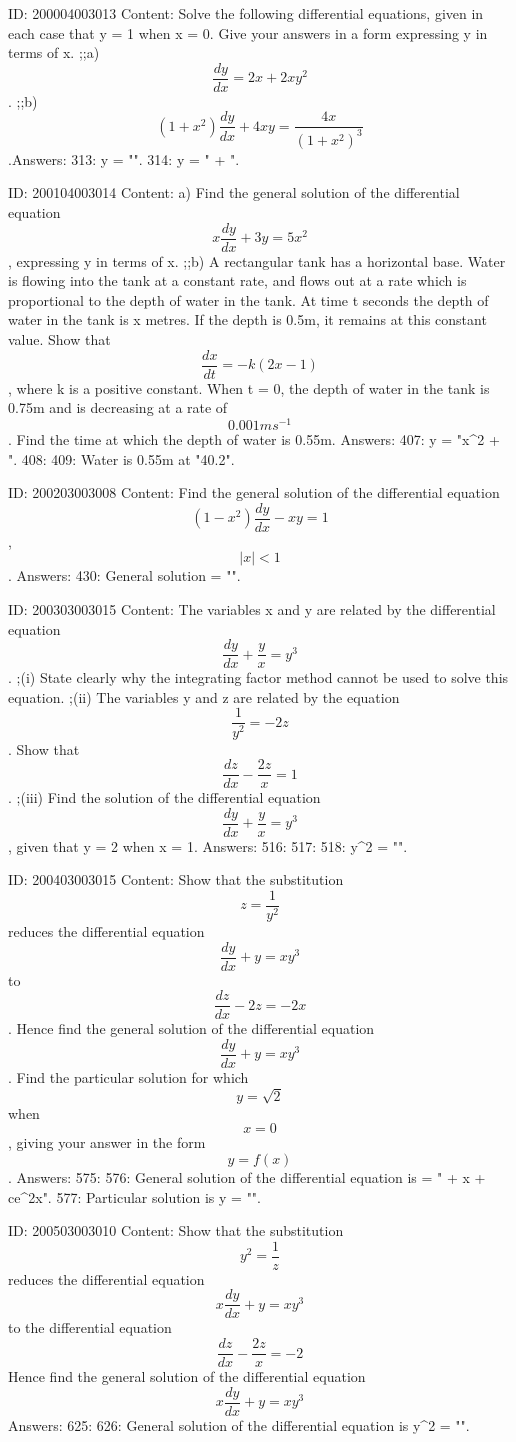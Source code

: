 \documentclass{article}
\begin{document}
ID: 200004003013
Content:
Solve the following differential equations, given in each case that y = 1 when x = 0. Give your answers in a form expressing y in terms of x. ;;a)$$\frac{dy}{dx} = 2x + 2xy^2 $$. ;;b)$$( 1 + x^2 )\frac{dy}{dx} + 4xy = \frac{4x}{( 1 + x^2  )^3}$$.Answers:
313: y = "".
314: y = " + ".

ID: 200104003014
Content:
a)  Find the general solution of the differential equation  $$x\frac{dy}{dx} + 3y = 5x^2 $$, expressing y in terms of x. ;;b) A rectangular tank has a horizontal base. Water is flowing into the tank at a constant rate, and flows out at a rate which is proportional to the depth of water in the tank. At time t seconds the depth of water in the tank   is x metres. If the depth is 0.5m, it remains at this constant value. Show that $$ \frac{dx}{dt} =  - k( 2x - 1 )$$, where k is a positive constant. When t = 0, the depth of water in the tank is 0.75m and is decreasing at a rate of  $$0.001ms^{- 1}$$. Find the time at which the depth of water is 0.55m.  Answers:
407: y = "x^2 + ".
408: 
409: Water is 0.55m at "40.2".

ID: 200203003008
Content:
Find the general solution of the differential equation  $$(1 - x^2)\frac{dy}{dx}- xy = 1$$,  $$| x | < 1$$. Answers:
430: General solution = "".

ID: 200303003015
Content:
The variables x and y are related by the differential equation  $$\frac{dy}{dx}+\frac{y}{x} = y^3 $$. ;(i) State clearly why the integrating factor method cannot be used to solve this equation. ;(ii) The variables y and z are related by the equation  $$\frac{1}{y^2} = -2z$$. Show that  $$\frac{dz}{dx} - \frac{2z}{x} = 1$$. ;(iii) Find the solution of the differential equation  $$\frac{dy}{dx} + \frac{y}{x} = y^3 $$, given that y = 2 when x = 1.  Answers:
516: 
517: 
518: y^2 = "".

ID: 200403003015
Content:
Show that the substitution  $$z = \frac{1}{y^2}$$ reduces the differential equation  $$\frac{dy}{dx}+y = xy^3 $$ to  $$\frac{dz}{dx}-2z = -2x$$. Hence find the general solution of the differential equation  $$\frac{dy}{dx} + y = xy^3 $$. Find the particular solution for which  $$y = \sqrt 2 $$ when $$x = 0$$, giving your answer in the form $$y = f(x)$$.  Answers:
575: 
576: General solution of the differential equation is  = " + x + ce^{2x}".
577: Particular solution is y = "".

ID: 200503003010
Content:
Show that the substitution $$y^2 = \frac{1}{z}$$ reduces the differential equation $$x\frac{dy}{dx} + y = x y^3$$  to the differential equation $$\frac{dz}{dx} - \frac{2z}{x} = - 2$$ Hence find the general solution of the differential equation $$x\frac{dy}{dx} + y = xy^{3}$$ Answers:
625: 
626: General solution of the differential equation is y^2 = "".
\end{document}
